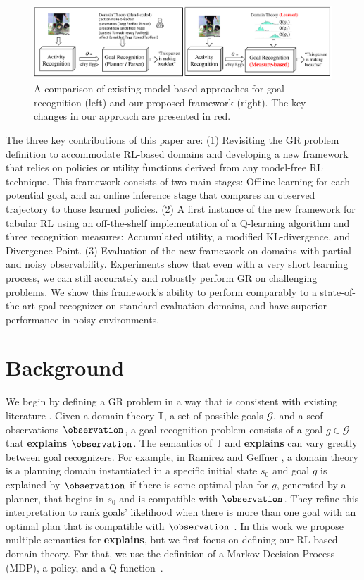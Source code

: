 \documentclass[letterpaper]{article}
\providecommand\initialstate{\ensuremath{s_{0}}}
\providecommand\theory{\mathbb{T}}
\providecommand\goals{\mathcal{G}}
\providecommand\goal{g}
\begin{document}
\begin{figure}[t]
    \centering
    \includegraphics[width=\textwidth]{Figures/cooking-new.pdf}
    \caption{A comparison of existing model-based approaches for goal recognition (left) and our proposed framework (right). The key changes in our approach are presented in red.}
    \label{fig:cooking}
\end{figure}

The three key contributions of this paper are:
(1) Revisiting the GR problem definition to accommodate RL-based domains and developing a new framework that relies on policies or utility functions derived from any model-free RL technique. This framework consists of two main stages: Offline learning
for each potential goal, and an online inference stage that compares an observed trajectory to those learned policies.
(2) A first instance of the new framework for tabular RL
using an off-the-shelf implementation of a Q-learning algorithm and three recognition measures: Accumulated utility, a modified KL-divergence, and Divergence Point.
(3) Evaluation of the new framework
on domains with partial and noisy observability.
Experiments show that even with a very short learning process, we can still accurately and robustly perform GR on challenging problems.
We show this framework's ability to perform comparably to a state-of-the-art goal recognizer on standard evaluation domains, and have superior performance in noisy environments.

\section*{Background}
\label{sec:background}

We begin by defining a GR problem in a way that is consistent with existing literature \cite{Meneguzzi2021,mirsky2021introduction}. Given a domain theory $\theory$, a set of possible goals $\goals$, and a seof observations $\observation$, a goal recognition problem consists of a goal $\goal \in \goals$ that \textbf{explains} $\observation$. %
The semantics of $\theory$ and \textbf{explains} can vary greatly between goal recognizers.
For example, in Ramirez and Geffner , a domain theory is a planning domain instantiated in a specific initial state $\initialstate$ and goal $\goal$ is explained by $\observation$ if there is some optimal plan for $\goal$, generated by a planner, that begins in $\initialstate$ and is compatible with $\observation$.
They refine this interpretation to rank goals' likelihood when there is more than one goal with an optimal plan that is compatible with $\observation$ \cite{ramirez2010probabilistic}.
In this work we propose multiple semantics for \textbf{explains}, but we first focus on defining our RL-based domain theory.
For that, we use the definition of a Markov Decision Process (MDP), a policy, and a Q-function~\cite{sutton2018reinforcement}.
\end{document}
